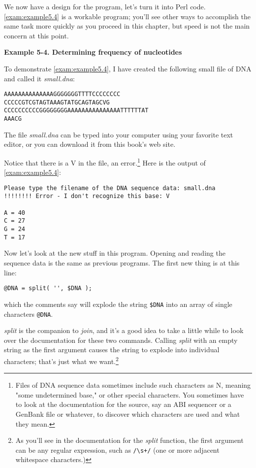 We now have a design for the program, let's turn it into Perl code. \autoref{exam:example5.4} is a workable program; you'll see other ways to accomplish the same task more quickly as you proceed in this chapter, but speed is not the main concern at this point. 

\textbf{Example 5-4. Determining frequency of nucleotides}


To demonstrate \autoref{exam:example5.4}, I have created the following small file of DNA and called it \textit{small.dna}: 

\begin{lstlisting}
AAAAAAAAAAAAAAGGGGGGGTTTTCCCCCCCC
CCCCCGTCGTAGTAAAGTATGCAGTAGCVG
CCCCCCCCCCGGGGGGGGAAAAAAAAAAAAAAATTTTTTAT
AAACG
\end{lstlisting}

The file \textit{small.dna} can be typed into your computer using your favorite text editor, or you can download it from this book's web site.

Notice that there is a V in the file, an error.\footnote{Files of DNA sequence data sometimes include such characters as N, meaning "some undetermined base," or other special characters. You sometimes have to look at the documentation for the source, say an ABI sequencer or a GenBank file or whatever, to discover which characters are used and what they mean.} Here is the output of \autoref{exam:example5.4}:

\begin{lstlisting}
Please type the filename of the DNA sequence data: small.dna
!!!!!!!! Error - I don't recognize this base: V

A = 40
C = 27
G = 24
T = 17
\end{lstlisting}

Now let's look at the new stuff in this program. Opening and reading the sequence data is the same as previous programs. The first new thing is at this line:

\begin{lstlisting}
@DNA = split( '', $DNA );
\end{lstlisting}

which the comments say will explode the string \verb|$DNA| into an array of single characters \verb|@DNA|.

\textit{split} is the companion to \textit{join}, and it's a good idea to take a little while to look over the documentation for these two commands. Calling \textit{split} with an empty string as the first argument causes the string to explode into individual characters; that's just what we want.\footnote{As you'll see in the documentation for the \textit{split} function, the first argument can be any regular expression, such as \verb|/\s+/| (one or more adjacent whitespace characters.)}

